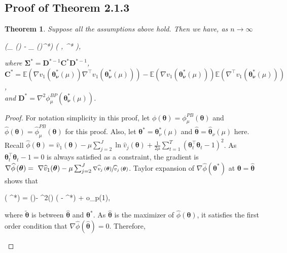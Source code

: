 \documentclass{article}
\newcommand{\wh}{\widehat}
\newcommand{\itl}{\intercal}
\newcommand{\bs}{ \boldsymbol}
\newcommand{\lt}{\left}
\newcommand{\rt}{\right}
\newtheorem{theorem}{Theorem}[section]
\begin{document}
\begin{appendices}
\section{Proof of Theorem 2.1.3}
\begin{theorem}
	Suppose all the assumptions above hold. Then we have, as $n\to \infty$
	\begin{flalign*}
	\lt(\wh{\bs{\theta}}_{\bs{\nu}}(\mu) - \bs{\theta}_{\bs{\nu}}(\mu)^*\rt)  \lt(\bs{0}, \bs{\Sigma}^* \rt),
	\end{flalign*}
	where $\bs{\Sigma}^* = \bs{D}^{*-1}\bs{C}^{*}\bs{D}^{*-1}$, 	\\$\bs{C}^* =\mathbb{E}\lt( \nabla v_1\lt(\bs{\theta}^*_{\bs{\nu}}(\mu)\rt)\nabla^{\itl} v_1\lt(\bs{\theta}^*_{\bs{\nu}}(\mu)\rt) \rt) - \mathbb{E}\lt(\nabla v_1\lt(\bs{\theta}^*_{\bs{\nu}}(\mu)\rt)\rt) \mathbb{E}\lt(\nabla^{\itl} v_1\lt(\bs{\theta}^*_{\bs{\nu}}(\mu)\rt)\rt)$,\\
	and $\bs{D}^*  =  \nabla^2 \phi^{BP}_{\mu}(\bs{\theta}^*_{\bs{\nu}}(\mu))$.
\end{theorem}
\begin{proof} For notation simplicity in this proof, let $\phi\lt(\bs{\theta}\rt) = \phi^{PB}_{\mu}\lt(\bs{\theta}\rt)$ and $\wh{\phi}(\bs{\theta}) = \wh{\phi}^{PB}_{\mu}\lt(\bs{\theta}\rt)$ for this proof. Also, let $\bs{\theta}^* = \bs{\theta}^*_{\nu}(\mu)$ and $\wh{\bs{\theta}} = \wh{\bs{\theta}}_{\nu}(\mu)$ here.
	Recall $ \wh{\phi}(\bs{\theta}) = \wh{v}_1(\bs{\theta}) - \mu \sum_{j=2}^J \ln \wh{v}_j(\bs{\theta}) + \frac{1}{2\mu}\sum_{t=1}^{T}(\bs{\theta}^{\itl}_t\bs{\theta}_t - 1)^2$.  As  $\bs{\theta}_t^{\itl}\bs{\theta}_t-1=0$ is always satisfied as a constraint, the gradient is $\nabla\wh{\phi}\lt(\bs{\theta}\rt) = \,\,\nabla\wh{v}_1(\bs{\theta}) - \mu \sum_{j=2}^J \sfrac{\nabla\wh{v}_j\lt( \bs{\theta}\rt)}{\wh{v}_j\lt( \bs{\theta}\rt)}$. Taylor expansion of $\nabla\wh{\phi}\lt(\bs{\theta}^*\rt)$ at $\bs{\theta} = \widehat{\bs{\theta}}$ shows that
	\begin{flalign*}
	\nabla\wh{\phi}\lt(\bs{\theta}^*\rt) =  \nabla\wh{\phi}(\wh{\bs{\theta}})- \nabla^2\wh{\phi}(\tilde{\bs{\theta}}) (\widehat{\bs{\theta}} - \bs{\theta}^{*}) + o_p(1),
	\end{flalign*}
	where $\tilde{\bs{\theta}}$ is between $\wh{\bs{\theta}}$ and $\bs{\theta}^*$. As $\widehat{\bs{\theta}}$ is the maximizer of $\widehat{\phi}\lt(\bs{\theta}\rt)$, it satisfies the first order condition that $\nabla \wh{\phi}(\widehat{\bs{\theta}}) = 0$. Therefore, 
	\begin{flalign}

\end{flalign}
\end{proof}
\end{appendices}
\end{document}
